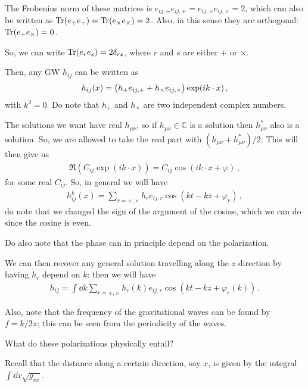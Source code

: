 \documentclass[main.tex]{subfiles}
\begin{document}
The Frobenius norm of these matrices is \(e_{ij,+} e_{ij, +} = e_{ij, \times} e_{ij, \times } = 2\), which can also be written as \(\operatorname{Tr} (e_{+} e_{+}) = \operatorname{Tr} (e_{ \times  } e_{ \times }) = 2\). Also, in this sense they are orthogonal: \(\operatorname{Tr} (e_{+} e_{ \times }) = 0\). 

So, we can write \(\operatorname{Tr} (e_{r} e_{s}) = 2 \delta_{rs}\), where  \(r\) and \(s\) are either \(+\) or \( \times \). 

Then, any GW \(h_{ij}\) can be written as 
%
\begin{align}
h_{ij} (x) = \qty(h_{+} e_{ij, +} + h_{ \times } e_{ij, \times }) \exp(i k \cdot x)
\,,
\end{align}
%
with \(k^2 = 0\). Do note that \(h_{+} \) and \(h_{ \times }\) are two independent complex numbers. 

The solutions we want have real \(h_{\mu \nu }\), so if \(h_{\mu \nu } \in \mathbb{C}\) is a solution then \(h_{\mu \nu }^{*}\) also is a solution. So, we are allowed to take the real part with \((h_{\mu \nu } + h_{\mu \nu }^{*}) / 2\). This will then give us 
%
\begin{align}
\Re (C_{ij} \exp(i k \cdot
 x ) ) = C_{ij}  \cos (i k \cdot x  + \varphi )
\,,
\end{align}
%
for some real \(C_{ij}\). So, in general we will have 
%
\begin{align}
h_{ij}^{k} (x) = \sum_{r = +, \times } h_{r} e_{ij, r} \cos(kt - kz + \varphi_{r} )
\,,
\end{align}
%
do note that we changed the sign of the argument of the cosine, which we can do since the cosine is even. 

Do also note that the phase can in principle depend on the polarization. 

We can then recover any general solution travelling along the \(z\) direction by having \(h_r\) depend on \(k\): then  we will have 
%
\begin{align}
h_{ij} = \int  \dd{k} \sum_{r = +, \times } h_{r} (k) e_{ij, r} \cos(kt - kz + \varphi_{r}(k) ) 
\,.
\end{align}

Also, note that the frequency of the gravitational waves can be found by \(f = k / 2\pi \); this can be seen from the periodicity of the waves. 

What do these polarizations physically entail? 

Recall that the distance along a certain direction, say \(x\), is given by the integral \(\int \dd{x} \sqrt{g_{xx}}\). 
\end{document}
